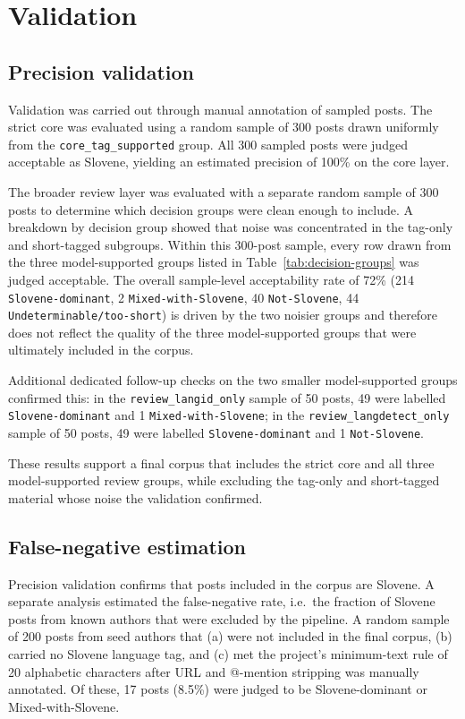 \section{Validation}
\label{sec:validation}

\subsection{Precision validation}

Validation was carried out through manual annotation of sampled posts. The strict core was evaluated using a random sample of 300 posts drawn uniformly from the \texttt{core\_tag\_supported} group. All 300 sampled posts were judged acceptable as Slovene, yielding an estimated precision of 100\% on the core layer.

The broader review layer was evaluated with a separate random sample of 300 posts to determine which decision groups were clean enough to include. A breakdown by decision group showed that noise was concentrated in the tag-only and short-tagged subgroups. Within this 300-post sample, every row drawn from the three model-supported groups listed in Table~\ref{tab:decision-groups} was judged acceptable. The overall sample-level acceptability rate of 72\% (214 \texttt{Slovene-dominant}, 2 \texttt{Mixed-with-Slovene}, 40 \texttt{Not-Slovene}, 44 \texttt{Undeterminable/too-short}) is driven by the two noisier groups and therefore does not reflect the quality of the three model-supported groups that were ultimately included in the corpus.

Additional dedicated follow-up checks on the two smaller model-supported groups confirmed this: in the \texttt{review\_langid\_only} sample of 50 posts, 49 were labelled \texttt{Slovene-dominant} and 1 \texttt{Mixed-with-Slovene}; in the \texttt{review\_langdetect\_only} sample of 50 posts, 49 were labelled \texttt{Slovene-dominant} and 1 \texttt{Not-Slovene}.

These results support a final corpus that includes the strict core and all three model-supported review groups, while excluding the tag-only and short-tagged material whose noise the validation confirmed.

\subsection{False-negative estimation}

Precision validation confirms that posts included in the corpus are Slovene. A separate analysis estimated the false-negative rate, i.e.\ the fraction of Slovene posts from known authors that were excluded by the pipeline. A random sample of 200 posts from seed authors that (a) were not included in the final corpus, (b) carried no Slovene language tag, and (c) met the project's minimum-text rule of 20 alphabetic characters after URL and @-mention stripping was manually annotated. Of these, 17 posts (8.5\%) were judged to be Slovene-dominant or Mixed-with-Slovene.

